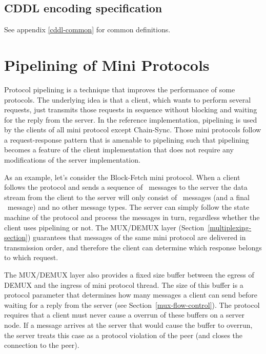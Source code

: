 \subsection{CDDL encoding specification}

See appendix \ref{cddl-common} for common definitions.

\section{Pipelining of Mini Protocols}
\label{pipelining}
Protocol pipelining is a technique that improves the performance of some protocols.
The underlying idea is that a client, which wants to perform several requests,
just transmits those requests in sequence without blocking and waiting for the reply from the server.
In the reference implementation, pipelining is used by the clients of all mini protocol except Chain-Sync.
Those mini protocols follow a request-response pattern that is amenable to pipelining such
that pipelining becomes a feature of the client implementation that does not require any
modifications of the server implementation.

As an example, let's consider the Block-Fetch mini protocol.
When a client follows the protocol and sends a sequence of \MsgRequestRange~messages to the server
the data stream from the client to the server will only consist of \MsgRequestRange~messages
(and a final \MsgClientDone~message) and no other message types.
The server can simply follow the state machine of the protocol and process the messages in turn,
regardless whether the client uses pipelining or not.
The MUX/DEMUX layer (Section~\ref{multiplexing-section}) guarantees
that messages of the same mini protocol are delivered in transmission order,
and therefore the client can determine which response belongs to which request.

The MUX/DEMUX layer also provides a fixed size buffer between the egress of DEMUX and the ingress
of mini protocol thread.
The size of this buffer is a protocol parameter that determines how many messages
a client can send before waiting for a reply from the server (see Section~\ref{mux-flow-control}).
The protocol requires that a client must never cause a overrun of these buffers on a server node.
If a message arrives at the server that would cause the buffer to overrun,
the server treats this case as a protocol violation of the peer
(and closes the connection to the peer).

